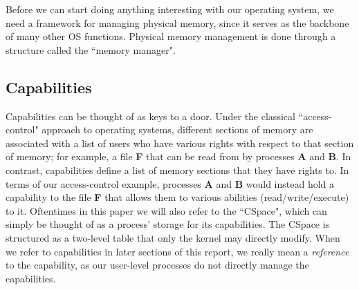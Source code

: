 Before we can start doing anything interesting with our operating system, we need a framework for managing physical memory, since it serves as the backbone of many other OS functions. Physical memory management is done through a structure called the ``memory manager".

\subsection{Capabilities}
Capabilities can be thought of as keys to a door. Under the classical ``access-control" approach to operating systems, different sections of memory are associated with a list of users who have various rights with respect to that section of memory; for example, a file \textbf{F} that can be read from by processes \textbf{A} and \textbf{B}. In contrast, capabilities define a list of memory sections that they have rights to. In terms of our access-control example, processes \textbf{A} and \textbf{B} would instead hold a capability to the file \textbf{F} that allows them to various abilities (read/write/execute) to it. Oftentimes in this paper we will also refer to the ``CSpace", which can simply be thought of as a process' storage for its capabilities. The CSpace is structured as a two-level table that only the kernel may directly modify. When we refer to capabilities in later sections of this report, we really mean a \textit{reference} to the capability, as our user-level processes do not directly manage the capabilities. 

